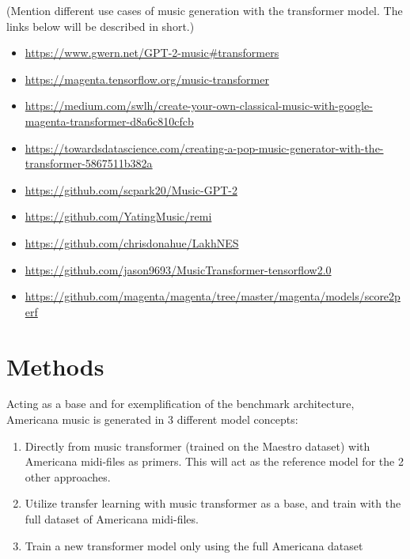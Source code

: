 \documentclass{article}
\begin{document}
        (Mention different use cases of music generation with the transformer model.
        The links below will be described in short.)
        
        \begin{itemize}
            \item \url{https://www.gwern.net/GPT-2-music#transformers}
            \item \url{https://magenta.tensorflow.org/music-transformer}
            \item \url{https://medium.com/swlh/create-your-own-classical-music-with-google-magenta-transformer-d8a6c810cfcb}
            \item \url{https://towardsdatascience.com/creating-a-pop-music-generator-with-the-transformer-5867511b382a}
            \item \url{https://github.com/scpark20/Music-GPT-2}
            \item \url{https://github.com/YatingMusic/remi}
            \item \url{https://github.com/chrisdonahue/LakhNES}
            \item \url{https://github.com/jason9693/MusicTransformer-tensorflow2.0}
            \item \url{https://github.com/magenta/magenta/tree/master/magenta/models/score2perf}
        \end{itemize}

    \section{Methods}

        Acting as a base and for exemplification of the benchmark architecture,
        Americana music is generated in 3 different model concepts:
        \begin{enumerate}
            \item Directly from music transformer (trained on the Maestro dataset)
                    with Americana midi-files as primers.
                    This will act as the reference model for the 2 other approaches.
            \item Utilize transfer learning with music transformer as a base, and
                    train with the full dataset of Americana midi-files.
            \item Train a new transformer model only using the full Americana dataset
        \end{enumerate} 
        
\end{document}
